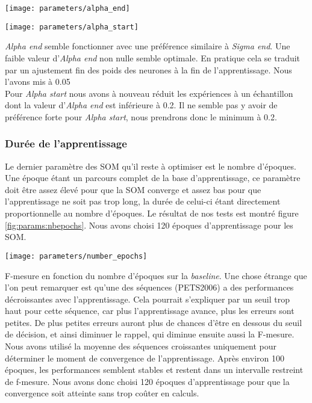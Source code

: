 	\begin{figureth}
		\begin{subfigureth}{.75\textwidth}
			\texttt{[image: parameters/alpha\_end]}	
		\end{subfigureth}
		\begin{subfigureth}{.75\textwidth}
			\texttt{[image: parameters/alpha\_start]}	
		\end{subfigureth}
		\caption[Optimisation d'$\alpha$]{\textit{Alpha end} semble fonctionner avec une préférence similaire à \textit{Sigma end}. Une faible valeur d'\textit{Alpha end} non nulle semble optimale. En pratique cela se traduit par un ajustement fin des poids des neurones à la fin de l'apprentissage. Nous l'avons mis à 0.05\\
		
		Pour \textit{Alpha start} nous avons à nouveau réduit les expériences à un échantillon dont la valeur d'\textit{Alpha end} est inférieure à 0.2. Il ne semble pas y avoir de préférence forte pour \textit{Alpha start}, nous prendrons donc le minimum à 0.2.}\label{fig:params:alphaopt}
	\end{figureth}


	\subsubsection{Durée de l'apprentissage}

	Le dernier paramètre des SOM qu'il reste à optimiser est le nombre d'époques. Une époque étant un parcours complet de la base d'apprentissage, ce paramètre doit être assez élevé pour que la SOM converge et assez bas pour que l'apprentissage ne soit pas trop long, la durée de celui-ci étant directement proportionnelle au nombre d'époques. Le résultat de nos tests est montré figure \ref{fig:params:nbepochs}. Nous avons choisi 120 époques d'apprentissage pour les SOM.

	\begin{figureth}
		\texttt{[image: parameters/number\_epochs]}
		\caption[Nombre d'époques]{F-mesure en fonction du nombre d'époques sur la \textit{baseline}. Une chose étrange que l'on peut remarquer est qu'une des séquences (PETS2006) a des performances décroissantes avec l'apprentissage. Cela pourrait s'expliquer par un seuil trop haut pour cette séquence, car plus l'apprentissage avance, plus les erreurs sont petites. De plus petites erreurs auront plus de chances d'être en dessous du seuil de décision, et ainsi diminuer le rappel, qui diminue ensuite aussi la F-mesure. Nous avons utilisé la moyenne des séquences croissantes uniquement pour déterminer le moment de convergence de l'apprentissage. Après environ 100 époques, les performances semblent stables et restent dans un intervalle restreint de f-mesure. Nous avons donc choisi 120 époques d'apprentissage pour que la convergence soit atteinte sans trop coûter en calculs.}\label{fig:params:nbepochs}
	\end{figureth}

